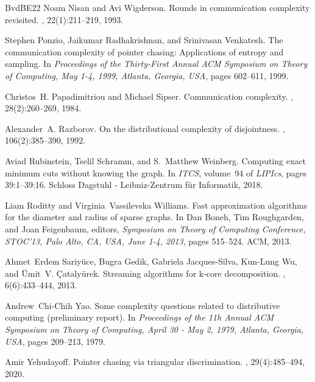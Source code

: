 \documentclass[11pt,letterpaper]{article}
\theoremstyle{definition}
\begin{document}
\begin{thebibliography}{BvdBE{\etalchar{+}}22}
Noam Nisan and Avi Wigderson.
\newblock Rounds in communication complexity revisited.
, 22(1):211--219, 1993.

Stephen Ponzio, Jaikumar Radhakrishnan, and Srinivasan Venkatesh.
\newblock The communication complexity of pointer chasing: Applications of entropy and sampling.
\newblock In {\em Proceedings of the Thirty-First Annual {ACM} Symposium on Theory of Computing, May 1-4, 1999, Atlanta, Georgia, {USA}}, pages 602--611, 1999.

Christos~H. Papadimitriou and Michael Sipser.
\newblock Communication complexity.
, 28(2):260--269, 1984.

Alexander~A. Razborov.
\newblock On the distributional complexity of disjointness.
, 106(2):385--390, 1992.

Aviad Rubinstein, Tselil Schramm, and S.~Matthew Weinberg.
\newblock Computing exact minimum cuts without knowing the graph.
\newblock In {\em {ITCS}}, volume~94 of {\em LIPIcs}, pages 39:1--39:16. Schloss Dagstuhl - Leibniz-Zentrum f{\"{u}}r Informatik, 2018.

Liam Roditty and Virginia~Vassilevska Williams.
\newblock Fast approximation algorithms for the diameter and radius of sparse graphs.
\newblock In Dan Boneh, Tim Roughgarden, and Joan Feigenbaum, editors, {\em Symposium on Theory of Computing Conference, STOC'13, Palo Alto, CA, USA, June 1-4, 2013}, pages 515--524. {ACM}, 2013.

Ahmet~Erdem Sariy{\"{u}}ce, Bugra Gedik, Gabriela Jacques{-}Silva, Kun{-}Lung Wu, and {\"{U}}mit~V. {\c{C}}ataly{\"{u}}rek.
\newblock Streaming algorithms for k-core decomposition.
, 6(6):433--444, 2013.

Andrew~Chi{-}Chih Yao.
\newblock Some complexity questions related to distributive computing (preliminary report).
\newblock In {\em Proceedings of the 11h Annual {ACM} Symposium on Theory of Computing, April 30 - May 2, 1979, Atlanta, Georgia, {USA}}, pages 209--213, 1979.

Amir Yehudayoff.
\newblock Pointer chasing via triangular discrimination.
, 29(4):485--494, 2020.

\end{thebibliography}
\end{document}
